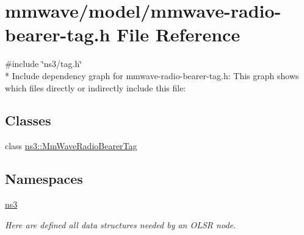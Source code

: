 \hypertarget{mmwave-radio-bearer-tag_8h}{}\section{mmwave/model/mmwave-\/radio-\/bearer-\/tag.h File Reference}
\label{mmwave-radio-bearer-tag_8h}
{\ttfamily \#include \char`\"{}ns3/tag.\+h\char`\"{}}\\*
Include dependency graph for mmwave-\/radio-\/bearer-\/tag.h\+:
This graph shows which files directly or indirectly include this file\+:
\subsection*{Classes}
\begin{DoxyCompactItemize}
\item 
class \hyperlink{classns3_1_1MmWaveRadioBearerTag}{ns3\+::\+Mm\+Wave\+Radio\+Bearer\+Tag}
\end{DoxyCompactItemize}
\subsection*{Namespaces}
\begin{DoxyCompactItemize}
\item 
 \hyperlink{namespacens3}{ns3}
\begin{DoxyCompactList}\small\item\em Here are defined all data structures needed by an O\+L\+SR node. \end{DoxyCompactList}\end{DoxyCompactItemize}
